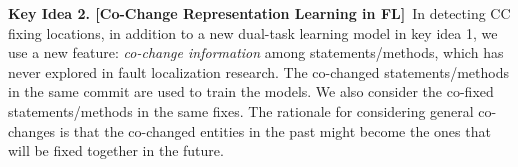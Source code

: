 





{\bf Key Idea 2. [Co-Change Representation Learning in FL]}~In
detecting CC fixing locations, in addition to a new dual-task learning
model in key idea 1, we use a new feature:
{\em co-change information} among statements/methods, which has never
explored in fault localization research.
%
The co-changed statements/methods in the same commit are used to train
the models. We also consider the co-fixed statements/methods in
the same fixes. The rationale for considering general co-changes
is that the co-changed entities in the past might become the ones
that will be fixed together in the future.


